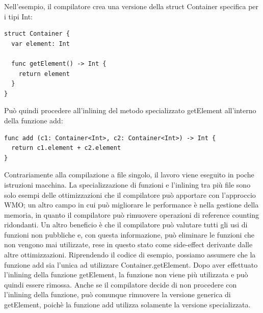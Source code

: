Nell'esempio, il compilatore crea una versione della struct Container specifica per i tipi Int: 
\begin{lstlisting}
struct Container {
  var element: Int

  func getElement() -> Int {
    return element
  }
}
\end{lstlisting}
Può quindi procedere all'inlining del metodo specializzato getElement all'interno della funzione add:
\begin{lstlisting}
func add (c1: Container<Int>, c2: Container<Int>) -> Int {
  return c1.element + c2.element
}
\end{lstlisting}
Contrariamente alla compilazione a file singolo, il lavoro viene eseguito in poche istruzioni macchina. La specializzazione di funzioni e l'inlining tra più file sono solo esempi delle ottimizzazioni che il compilatore può apportare con l'approccio WMO; un altro campo in cui può migliorare le performance è nella gestione della memoria, in quanto il compilatore può rimuovere operazioni di reference counting ridondanti. Un altro beneficio è che il compilatore può valutare tutti gli usi di funzioni non pubbliche e, con questa informazione, può eliminare le funzioni che non vengono mai utilizzate, rese in questo stato come side-effect derivante dalle altre ottimizzazioni. Riprendendo il codice di esempio, possiamo assumere che la funzione add sia l'unica ad utilizzare Container.getElement. Dopo aver effettuato l'inlining della funzione getElement, la funzione non viene più utilizzata e può quindi essere rimossa. Anche se il compilatore decide di non procedere con l'inlining della funzione, può comunque rimuovere la versione generica di getElement, poichè la funzione add utilizza solamente la versione specializzata.
